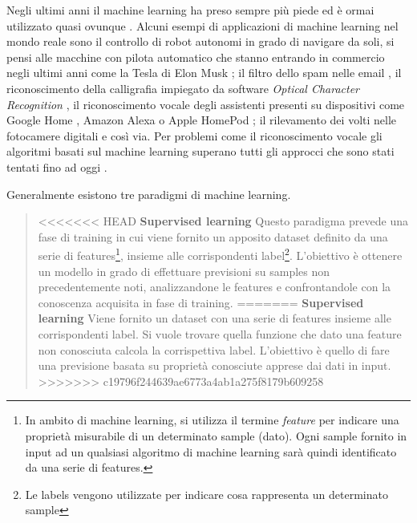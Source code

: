 \documentclass[../main.tex]{subfiles}
\begin{document}
Negli ultimi anni il machine learning ha preso sempre più piede ed è ormai utilizzato quasi ovunque \cite{compIntelligence}. Alcuni esempi di applicazioni di machine learning nel mondo reale sono il controllo di robot autonomi in grado di navigare da soli, si pensi alle macchine con pilota automatico che stanno entrando in commercio negli ultimi anni come la Tesla di Elon Musk \cite{tesla}; il filtro dello spam nelle email \cite{spamemail}, il riconoscimento della calligrafia impiegato da software \textit{Optical Character Recognition} \cite{ocr}, il riconoscimento vocale degli assistenti presenti su dispositivi come Google Home \cite{googlehome}, Amazon Alexa \cite{amazonalexa} o Apple HomePod \cite{applehomepod}; il rilevamento dei volti nelle fotocamere digitali \cite{facialrecognition} e così via.
Per problemi come il riconoscimento vocale gli algoritmi basati sul machine learning superano tutti gli approcci che sono stati tentati fino ad oggi \cite{mldef}.


Generalmente esistono tre paradigmi di machine learning\cite{ai}.
\begin{verse}
<<<<<<< HEAD
				\textbf{Supervised learning} Questo paradigma prevede una fase di training in cui viene fornito un apposito dataset definito da una serie di features\footnote{In ambito di machine learning, si utilizza il termine \textit{feature} per indicare una proprietà misurabile di un determinato sample (dato). Ogni sample fornito in input ad un qualsiasi algoritmo di machine learning sarà quindi identificato da una serie di features.}, insieme alle corrispondenti label\footnote{Le labels vengono utilizzate per indicare cosa rappresenta un determinato sample}. L'obiettivo è ottenere un modello in grado di effettuare previsioni su samples non precedentemente noti, analizzandone le features e confrontandole con la conoscenza acquisita in fase di training.
=======
				\textbf{Supervised learning} Viene fornito un dataset con una serie di features insieme alle corrispondenti label. Si vuole trovare quella funzione che dato una feature non conosciuta calcola la corrispettiva label. L'obiettivo è quello di fare una previsione basata su proprietà conosciute apprese dai dati in input.
>>>>>>> c19796f244639ae6773a4ab1a275f8179b609258
\end{verse}
\end{document}
